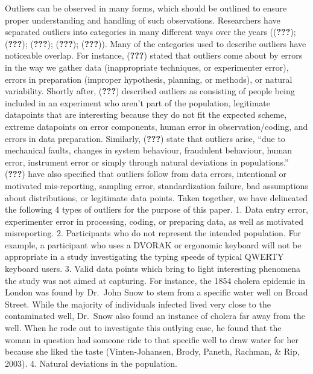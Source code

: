 \documentclass[english,man]{apa6}
\theoremstyle{definition}
\theoremstyle{definition}
\theoremstyle{definition}
\theoremstyle{remark}
\begin{document}
Outliers can be observed in many forms, which should be outlined to
ensure proper understanding and handling of such observations.
Researchers have separated outliers into categories in many different
ways over the years (({\textbf{???}}); ({\textbf{???}});
({\textbf{???}}); ({\textbf{???}}); ({\textbf{???}})). Many of the
categories used to describe outliers have noticeable overlap. For
instance, ({\textbf{???}}) stated that outliers come about by errors in
the way we gather data (inappropriate techniques, or experimenter
error), errors in preparation (improper hypothesis, planning, or
methods), or natural variability. Shortly after, ({\textbf{???}})
described outliers as consisting of people being included in an
experiment who aren't part of the population, legitimate datapoints that
are interesting because they do not fit the expected scheme, extreme
datapoints on error components, human error in observation/coding, and
errors in data preparation. Similarly, ({\textbf{???}}) state that
outliers arise, \enquote{due to mechanical faults, changes in system
behaviour, fraudulent behaviour, human error, instrument error or simply
through natural deviations in populations.} ({\textbf{???}}) have also
specified that outliers follow from data errors, intentional or
motivated mis-reporting, sampling error, standardization failure, bad
assumptions about distributions, or legitimate data points. Taken
together, we have delineated the following 4 types of outliers for the
purpose of this paper. 1. Data entry error, experimenter error in
processing, coding, or preparing data, as well as motivated
misreporting. 2. Participants who do not represent the intended
population. For example, a participant who uses a DVORAK or ergonomic
keyboard will not be appropriate in a study investigating the typing
speeds of typical QWERTY keyboard users. 3. Valid data points which
bring to light interesting phenomena the study was not aimed at
capturing. For instance, the 1854 cholera epidemic in London was found
by Dr.~John Snow to stem from a specific water well on Broad Street.
While the majority of individuals infected lived very close to the
contaminated well, Dr.~Snow also found an instance of cholera far away
from the well. When he rode out to investigate this outlying case, he
found that the woman in question had someone ride to that specific well
to draw water for her because she liked the taste (Vinten-Johansen,
Brody, Paneth, Rachman, \& Rip, 2003). 4. Natural deviations in the
population.
\end{document}
